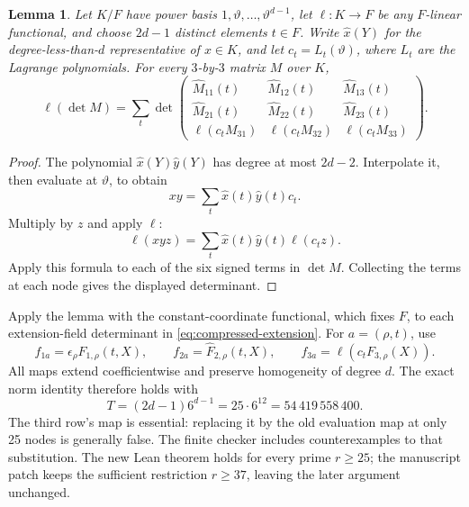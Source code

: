 \documentclass[11pt]{article}
\newtheorem{lemma}{Lemma}
\begin{document}
\begin{lemma}\label{lem:bilinear-descent}
Let \(K/F\) have power basis \(1,\vartheta,\ldots,\vartheta^{d-1}\),
let \(\ell:K\to F\) be any \(F\)-linear functional, and choose
\(2d-1\) distinct elements \(t\in F\). Write \(\widehat x(Y)\) for
the degree-less-than-\(d\) representative of \(x\in K\), and let
\(c_t=L_t(\vartheta)\), where \(L_t\) are the Lagrange polynomials.
For every \(3\)-by-\(3\) matrix \(M\) over \(K\),
\[
 \ell(\det M)=\sum_t
 \det\begin{pmatrix}
  \widehat M_{11}(t)&\widehat M_{12}(t)&\widehat M_{13}(t)\\
  \widehat M_{21}(t)&\widehat M_{22}(t)&\widehat M_{23}(t)\\
  \ell(c_tM_{31})&\ell(c_tM_{32})&\ell(c_tM_{33})
 \end{pmatrix}.
\]
\end{lemma}
\begin{proof}
The polynomial \(\widehat x(Y)\widehat y(Y)\) has degree at most
\(2d-2\). Interpolate it, then evaluate at \(\vartheta\), to obtain
\[
 xy=\sum_t\widehat x(t)\widehat y(t)c_t.
\]
Multiply by \(z\) and apply \(\ell\):
\[
 \ell(xyz)=\sum_t\widehat x(t)\widehat y(t)\ell(c_tz).
\]
Apply this formula to each of the six signed terms in \(\det M\).
Collecting the terms at each node gives the displayed determinant.
\end{proof}

Apply the lemma with the constant-coordinate functional, which fixes
\(F\), to each extension-field determinant in
\eqref{eq:compressed-extension}. For \(a=(\rho,t)\), use
\[
 f_{1a}=\epsilon_\rho\widehat F_{1,\rho}(t,X),\qquad
 f_{2a}=\widehat F_{2,\rho}(t,X),\qquad
 f_{3a}=\ell(c_tF_{3,\rho}(X)).
\]
All maps extend coefficientwise and preserve homogeneity of degree
\(d\). The exact norm identity therefore holds with
\[
 T=(2d-1)6^{d-1}=25\cdot6^{12}=54\,419\,558\,400.
\]
The third row's map is essential: replacing it by the old evaluation
map at only 25 nodes is generally false. The finite checker includes
counterexamples to that substitution. The new Lean theorem holds for
every prime \(r\ge25\); the manuscript patch keeps the sufficient
restriction \(r\ge37\), leaving the later argument unchanged.
\end{document}

